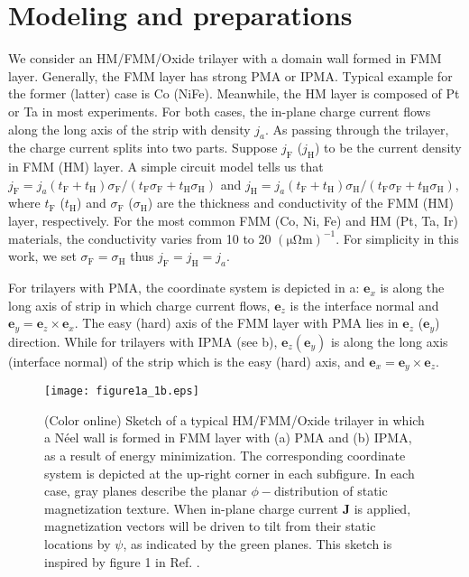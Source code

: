 \documentclass[12pt]{iopart}
\begin{document}
\section{Modeling and preparations}\label{Modeling}
We consider an HM/FMM/Oxide trilayer with a domain wall formed in FMM layer.
Generally, the FMM layer has strong PMA or IPMA.
Typical example for the former (latter) case is Co (NiFe).  
Meanwhile, the HM layer is composed of Pt or Ta in most experiments.
For both cases, the in-plane charge current flows along the long axis of the strip
with density $j_a$.
As passing through the trilayer, the charge current splits into two parts.
Suppose $j_{\mathrm{F}}$ ($j_{\mathrm{H}}$) to be the current density in FMM (HM) layer.
A simple circuit model tells us that $j_{\mathrm{F}}=j_a(t_{\mathrm{F}}+t_{\mathrm{H}})\sigma_{\mathrm{F}}/(t_{\mathrm{F}}\sigma_{\mathrm{F}}+t_{\mathrm{H}}\sigma_{\mathrm{H}})$ and $j_{\mathrm{H}}=j_a(t_{\mathrm{F}}+t_{\mathrm{H}})\sigma_{\mathrm{H}}/(t_{\mathrm{F}}\sigma_{\mathrm{F}}+t_{\mathrm{H}}\sigma_{\mathrm{H}})$, where $t_{\mathrm{F}}$ ($t_{\mathrm{H}}$) and $\sigma_{\mathrm{F}}$ ($\sigma_{\mathrm{H}}$) 
are the thickness and conductivity of the FMM (HM) layer, respectively.
For the most common FMM (Co, Ni, Fe) and HM (Pt, Ta, Ir) materials, 
the conductivity varies from 10 to 20 $\mathrm{(\mu\Omega m)}^{-1}$.
For simplicity in this work, we set $\sigma_{\mathrm{F}}=\sigma_{\mathrm{H}}$ thus 
$j_{\mathrm{F}}=j_{\mathrm{H}}=j_a$.


For trilayers with PMA, the coordinate system is depicted in a:
$\mathbf{e}_x$ is along the long axis of strip in which charge current flows, 
$\mathbf{e}_z$ is the interface normal
and $\mathbf{e}_y=\mathbf{e}_z\times\mathbf{e}_x$.
The easy (hard) axis of the FMM layer with PMA lies in $\mathbf{e}_z$ ($\mathbf{e}_y$) direction.
While for trilayers with IPMA (see b), $\mathbf{e}_z(\mathbf{e}_y)$ is along the long axis (interface normal) 
of the strip which is the easy (hard) axis, and $\mathbf{e}_x=\mathbf{e}_y\times\mathbf{e}_z$.


\begin{figure}[htbp]
	\centering
	\texttt{[image: figure1a\_1b.eps]}
	\caption{(Color online) Sketch of a typical HM/FMM/Oxide trilayer in which
		a N\'{e}el wall is formed in FMM layer with (a) PMA and (b) IPMA, as a result of
		energy minimization.
		The corresponding coordinate system is depicted at the up-right corner in each subfigure.	
		In each case, gray planes describe the planar $\phi-$distribution of static magnetization texture.
		When in-plane charge current $\mathbf{J}$ is applied, magnetization
		vectors will be driven to tilt from their static locations by $\psi$,
		as indicated by the green planes.
		This sketch is inspired by figure 1 in Ref. \cite{Linder_PRB_2013b}.}\label{fig1}
\end{figure}
\end{document}
